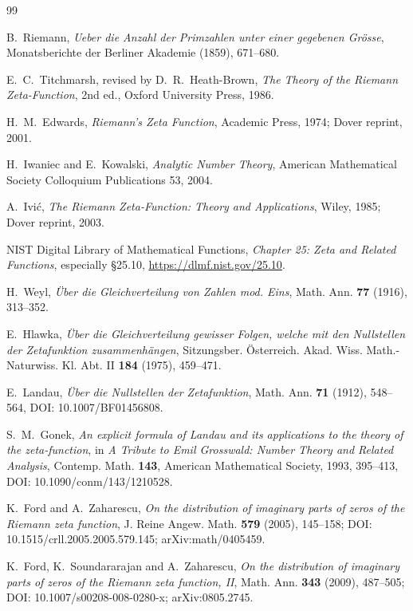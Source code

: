 \documentclass[11pt]{amsart}
\numberwithin{equation}{section}
\theoremstyle{definition}
\theoremstyle{remark}
\begin{document}
\begin{thebibliography}{99}

B.~Riemann,
\emph{Ueber die Anzahl der Primzahlen unter einer gegebenen Grösse},
Monatsberichte der Berliner Akademie (1859), 671--680.

E.~C.~Titchmarsh, revised by D.~R.~Heath-Brown,
\emph{The Theory of the Riemann Zeta-Function}, 2nd ed.,
Oxford University Press, 1986.

H.~M.~Edwards,
\emph{Riemann's Zeta Function},
Academic Press, 1974; Dover reprint, 2001.

H.~Iwaniec and E.~Kowalski,
\emph{Analytic Number Theory},
American Mathematical Society Colloquium Publications 53, 2004.

A.~Ivić,
\emph{The Riemann Zeta-Function: Theory and Applications},
Wiley, 1985; Dover reprint, 2003.

NIST Digital Library of Mathematical Functions,
\emph{Chapter 25: Zeta and Related Functions}, especially \S25.10,
\url{https://dlmf.nist.gov/25.10}.

H.~Weyl,
\emph{Über die Gleichverteilung von Zahlen mod. Eins},
Math. Ann. \textbf{77} (1916), 313--352.

E.~Hlawka,
\emph{Über die Gleichverteilung gewisser Folgen, welche mit den Nullstellen der Zetafunktion zusammenhängen},
Sitzungsber. Österreich. Akad. Wiss. Math.-Naturwiss. Kl. Abt. II \textbf{184} (1975), 459--471.

E.~Landau,
\emph{Über die Nullstellen der Zetafunktion},
Math. Ann. \textbf{71} (1912), 548--564,
DOI: 10.1007/BF01456808.

S.~M.~Gonek,
\emph{An explicit formula of Landau and its applications to the theory of the zeta-function},
in \emph{A Tribute to Emil Grosswald: Number Theory and Related Analysis},
Contemp. Math. \textbf{143}, American Mathematical Society, 1993, 395--413,
DOI: 10.1090/conm/143/1210528.

K.~Ford and A.~Zaharescu,
\emph{On the distribution of imaginary parts of zeros of the Riemann zeta function},
J. Reine Angew. Math. \textbf{579} (2005), 145--158;
DOI: 10.1515/crll.2005.2005.579.145; arXiv:math/0405459.

K.~Ford, K.~Soundararajan and A.~Zaharescu,
\emph{On the distribution of imaginary parts of zeros of the Riemann zeta function, II},
Math. Ann. \textbf{343} (2009), 487--505;
DOI: 10.1007/s00208-008-0280-x; arXiv:0805.2745.


\end{thebibliography}
\end{document}
